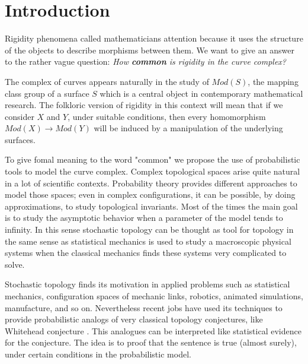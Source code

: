 \chapter*{Introduction} %

\label{Intro} %



Rigidity phenomena called mathematicians attention because it uses the structure of the objects to describe morphisms between them. We want to give an answer to the rather vague question: \textit{How \textbf{common} is rigidity in the curve complex?}

The complex of curves appears naturally in the study of $Mod(S)$, the mapping class group of a surface $S$ which is a central object in contemporary mathematical research. The folkloric version of rigidity in this context will mean that if we consider $X$ and $Y$, under suitable conditions, then every homomorphism $Mod(X) \to Mod(Y)$ will be induced by a manipulation of the underlying surfaces.

To give fomal meaning to the word "common" we propose the use of probabilistic tools to model the curve complex. Complex topological spaces arise quite natural in a lot of scientific contexts. Probability theory provides different approaches to model those spaces; even in complex configurations, it can be possible, by doing approximations, to study topological invariants. Most of the times the main goal is to study the asymptotic behavior when a parameter of the model tends to infinity. In this sense stochastic topology can be thought as tool for topology in the same sense as statistical mechanics is used to study a macroscopic physical systems when the classical mechanics finds these systems very complicated to solve.

Stochastic topology finds its motivation in applied problems such as statistical mechanics, configuration spaces of mechanic links, robotics, animated simulations, manufacture, and so on. Nevertheless recent jobs have used its techniques to provide probabilistic analogs of very classical topology conjectures, like Whitehead conjecture \cite{Costa15}. This analogues can be interpreted like statistical evidence for the conjecture. The idea is to proof that the sentence is true (almost surely), under certain conditions in the probabilistic model.

